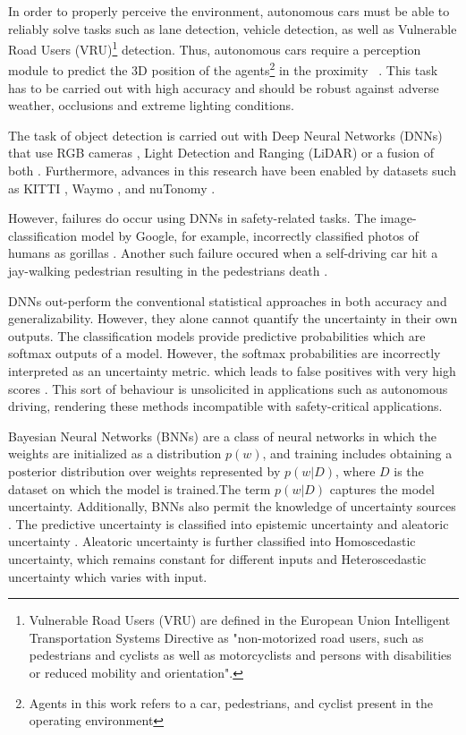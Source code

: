 \documentclass[10pt,twocolumn,letterpaper]{article}
\begin{document}
In order to properly perceive the environment, autonomous cars must be able to reliably solve tasks such as lane detection, vehicle detection, as well as Vulnerable Road Users (VRU)\footnote{Vulnerable Road Users (VRU) are defined in the European Union Intelligent Transportation Systems Directive as "non-motorized road users, such as pedestrians and cyclists as well as motorcyclists and persons with disabilities or reduced mobility and orientation".} detection. Thus, autonomous cars require a perception module to predict the 3D position of the agents\footnote{Agents in this work refers to a car, pedestrians, and cyclist present in the operating environment} in the proximity ~\cite{KITTI2012}. This task has to be carried out with high accuracy and should be robust against adverse weather, occlusions and extreme lighting conditions. 

The task of object detection is carried out with Deep Neural Networks (DNNs) \cite{Rao2018, Arnold2019} that use RGB cameras \cite{Chen2016, Mousavian2017, Chabot2017, Chen2017}, Light Detection and Ranging (LiDAR) \cite{VOTE3DEEP2017, Zhou2018, Sahba2019, Simon2018, Xiang2015} or a fusion of both \cite{Du2018, FPointnet2018, AVOD2018, FrustumConvnet2019}. Furthermore, advances in this research have been enabled by datasets such as KITTI \cite{KITTI2012}, Waymo \cite{Waymo2019}, and nuTonomy \cite{Caesar2020}.

However, failures do occur using DNNs in safety-related tasks. \label{GoogleFailure} The image-classification model by Google, for example, incorrectly classified photos of humans as gorillas \cite{Mulshine2015}. Another such failure occured \label{Uberfailure} when a self-driving car hit a jay-walking pedestrian resulting in the pedestrians death \cite{SLJCW2018}.

DNNs out-perform the conventional statistical approaches in both accuracy and generalizability. However, they alone cannot quantify the uncertainty in their own outputs. The classification models provide predictive probabilities which are softmax outputs of a model. However, the softmax probabilities are incorrectly interpreted as an uncertainty metric. which leads to false positives with very high scores \cite{Blundell2015, Malinin2018}. This sort of behaviour is unsolicited in applications such as autonomous driving, rendering these methods incompatible with safety-critical applications. 

Bayesian Neural Networks (BNNs) \cite{tran2016edward, Shridhar2018, Tran2019} are a class of neural networks in which the weights are initialized as a distribution $p(w)$, and training includes obtaining a posterior distribution over weights represented by $p (w|D)$, where $D$ is the dataset on which the model is trained.The term $p (w|D)$ captures the model uncertainty. Additionally, BNNs also permit the knowledge of uncertainty sources \cite{Henne2020}. The predictive uncertainty is classified into epistemic uncertainty and aleatoric uncertainty \cite{Kendall2017}. Aleatoric uncertainty is further classified into Homoscedastic uncertainty, which remains constant for different inputs and Heteroscedastic uncertainty which varies with input.
\end{document}

